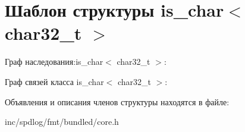 \hypertarget{structis__char_3_01char32__t_01_4}{}\section{Шаблон структуры is\+\_\+char$<$ char32\+\_\+t $>$}
\label{structis__char_3_01char32__t_01_4}


Граф наследования\+:is\+\_\+char$<$ char32\+\_\+t $>$\+:


Граф связей класса is\+\_\+char$<$ char32\+\_\+t $>$\+:


Объявления и описания членов структуры находятся в файле\+:\begin{DoxyCompactItemize}
\item 
inc/spdlog/fmt/bundled/core.\+h\end{DoxyCompactItemize}
